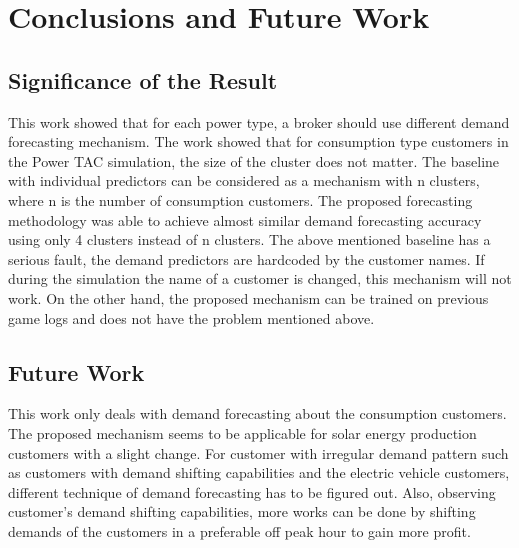 
\chapter{Conclusions and Future Work}

\section{Significance of the Result}
This work showed that for each power type, a broker should use different demand forecasting mechanism. The work showed that for consumption type customers in the Power TAC simulation, the size of the cluster does not matter. The baseline with individual predictors can be considered as a mechanism with n clusters, where n is the number of consumption customers. The proposed forecasting methodology was able to achieve almost similar demand forecasting accuracy using only 4 clusters instead of n clusters. The above mentioned baseline has a serious fault, the demand predictors are hardcoded by the customer names. If during the simulation the name of a customer is changed, this mechanism will not work. On the other hand, the proposed mechanism can be trained on previous game logs and does not have the problem mentioned above.

\section{Future Work}

This work only deals with demand forecasting about the consumption customers. The proposed mechanism seems to be applicable for solar energy production customers with a slight change. For customer with irregular demand pattern such as customers with demand shifting capabilities and the electric vehicle customers, different technique of demand forecasting has to be figured out. Also, observing customer's demand shifting capabilities, more works can be done by shifting demands of the customers in a preferable off peak hour to gain more profit.
